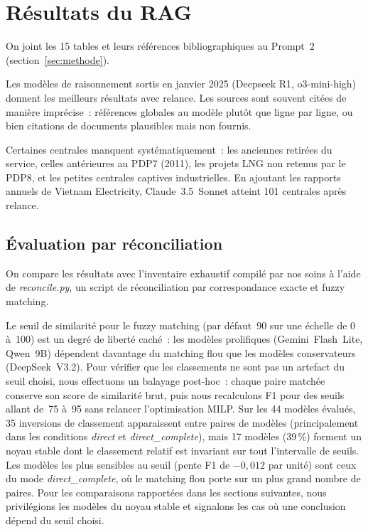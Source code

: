 \documentclass[a4paper,11pt]{report}
\begin{document}
\section{Résultats du RAG}

On joint les 15 tables et leurs références bibliographiques au Prompt~2 (section~\ref{sec:methode}).


Les modèles de raisonnement sortis en janvier 2025 (Deepseek R1, o3-mini-high) donnent les meilleurs résultats avec relance. Les sources sont souvent citées de manière imprécise~: références globales au modèle plutôt que ligne par ligne, ou bien citations de documents plausibles mais non fournis.

Certaines centrales manquent systématiquement~: les anciennes retirées du service, celles antérieures au PDP7 (2011), les projets LNG non retenus par le PDP8, et les petites centrales captives industrielles. En ajoutant les rapports annuels de Vietnam Electricity, Claude~3.5~Sonnet atteint 101 centrales après relance.

\subsection{Évaluation par réconciliation}

On compare les résultats avec l'inventaire exhaustif compilé par nos soins à l'aide de \emph{reconcile.py}, un script de réconciliation par correspondance exacte et fuzzy matching.

Le seuil de similarité pour le fuzzy matching (par défaut~90 sur une échelle de 0 à~100) est un degré de liberté caché~: les modèles prolifiques (Gemini~Flash~Lite, Qwen~9B) dépendent davantage du matching flou que les modèles conservateurs (DeepSeek~V3.2). Pour vérifier que les classements ne sont pas un artefact du seuil choisi, nous effectuons un balayage post-hoc~: chaque paire matchée conserve son score de similarité brut, puis nous recalculons F1 pour des seuils allant de~75 à~95 sans relancer l'optimisation MILP. Sur les 44 modèles évalués, 35 inversions de classement apparaissent entre paires de modèles (principalement dans les conditions \emph{direct} et \emph{direct\_complete}), mais 17 modèles (39\,\%) forment un noyau stable dont le classement relatif est invariant sur tout l'intervalle de seuils. Les modèles les plus sensibles au seuil (pente F1 de $-0{,}012$ par unité) sont ceux du mode \emph{direct\_complete}, où le matching flou porte sur un plus grand nombre de paires. Pour les comparaisons rapportées dans les sections suivantes, nous privilégions les modèles du noyau stable et signalons les cas où une conclusion dépend du seuil choisi.
\end{document}
